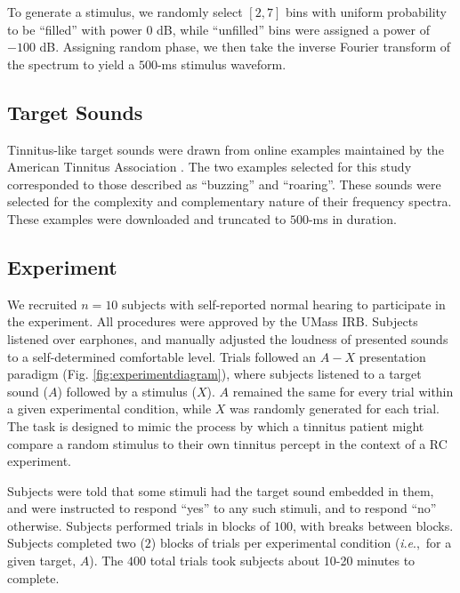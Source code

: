 \documentclass[journal]{IEEEtran}
\newcommand{\ie}{\textit{i}.\textit{e}.,\ }
\begin{document}
To generate a stimulus, we randomly select $[2,7]$ bins with uniform probability to be ``filled'' with power $0$ dB,
while ``unfilled'' bins were assigned a power of $-100$ dB. 
Assigning random phase, we then take the inverse Fourier transform of the spectrum to yield a $500$-ms stimulus waveform.

\subsection{Target Sounds}

Tinnitus-like target sounds were drawn from online examples maintained by the American Tinnitus Association
\cite{MeasuringTinnitusAmerican2022}.
The two examples selected for this study corresponded to those described as ``buzzing'' and ``roaring''.
These sounds were selected for the complexity and complementary nature of their frequency spectra.
These examples were downloaded and truncated to $500$-ms in duration. 

\subsection{Experiment}

We recruited $n=10$ subjects with self-reported normal hearing to participate in the experiment.
All procedures were approved by the UMass IRB.
Subjects listened over earphones, and manually adjusted the loudness of presented sounds to a self-determined comfortable level.
Trials followed an $A-X$ presentation paradigm (Fig. \ref{fig:experimentdiagram}),
where subjects listened to a target sound ($A$) followed by a stimulus ($X$).
$A$ remained the same for every trial within a given experimental condition,
while $X$ was randomly generated for each trial.
The task is designed to mimic the process by which a tinnitus patient might compare a random stimulus to their own tinnitus percept in the context of a RC experiment.

Subjects were told that some stimuli had the target sound embedded in them, and were instructed to respond ``yes'' to any such stimuli, and to respond ``no'' otherwise.
Subjects performed trials in blocks of $100$, with breaks between blocks.
Subjects completed two ($2$) blocks of trials per experimental condition (\ie for a given target, $A$).
The $400$ total trials took subjects about 10-20 minutes to complete.
\end{document}
